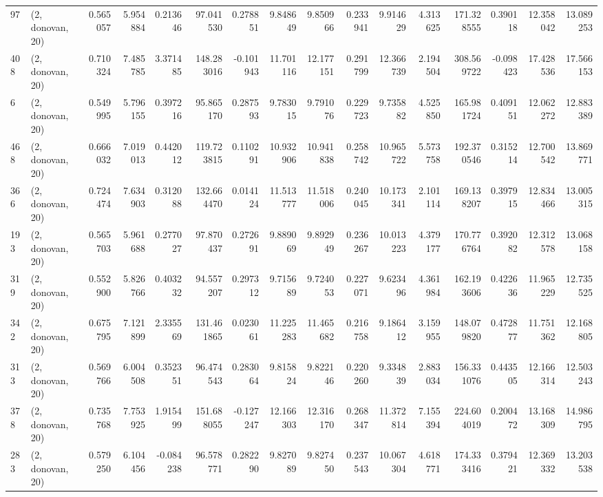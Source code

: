 \begin{tabular}{llrrrrrrrrrrrrrr}
97  &  (2, donovan, 20) &   0.565057 &   5.954884 &   0.213646 &    97.041530 &   0.278851 &   9.848649 &   9.850966 &  0.233941 &   9.914629 &   4.313625 &   171.328555 &  0.390118 &  12.358042 &  13.089253 \\
408 &  (2, donovan, 20) &   0.710324 &   7.485785 &   3.371485 &   148.283016 &  -0.101943 &  11.701116 &  12.177151 &  0.291799 &  12.366739 &   2.194504 &   308.569722 & -0.098423 &  17.428536 &  17.566153 \\
6   &  (2, donovan, 20) &   0.549995 &   5.796155 &   0.397216 &    95.865170 &   0.287593 &   9.783015 &   9.791076 &  0.229723 &   9.735882 &   4.525850 &   165.981724 &  0.409151 &  12.062272 &  12.883389 \\
468 &  (2, donovan, 20) &   0.666032 &   7.019013 &   0.442012 &   119.723815 &   0.110291 &  10.932906 &  10.941838 &  0.258742 &  10.965722 &   5.573758 &   192.370546 &  0.315214 &  12.700542 &  13.869771 \\
366 &  (2, donovan, 20) &   0.724474 &   7.634903 &   0.312088 &   132.664470 &   0.014124 &  11.513777 &  11.518006 &  0.240045 &  10.173341 &   2.101114 &   169.138207 &  0.397915 &  12.834466 &  13.005315 \\
193 &  (2, donovan, 20) &   0.565703 &   5.961688 &   0.277027 &    97.870437 &   0.272691 &   9.889069 &   9.892949 &  0.236267 &  10.013223 &   4.379177 &   170.776764 &  0.392082 &  12.312578 &  13.068158 \\
319 &  (2, donovan, 20) &   0.552900 &   5.826766 &   0.403232 &    94.557207 &   0.297312 &   9.715689 &   9.724053 &  0.227071 &   9.623496 &   4.361984 &   162.193606 &  0.422636 &  11.965229 &  12.735525 \\
342 &  (2, donovan, 20) &   0.675795 &   7.121899 &   2.335569 &   131.461865 &   0.023061 &  11.225283 &  11.465682 &  0.216758 &   9.186412 &   3.159955 &   148.079820 &  0.472877 &  11.751362 &  12.168805 \\
313 &  (2, donovan, 20) &   0.569766 &   6.004508 &   0.352351 &    96.474543 &   0.283064 &   9.815824 &   9.822146 &  0.220260 &   9.334839 &   2.883034 &   156.331076 &  0.443505 &  12.166314 &  12.503243 \\
378 &  (2, donovan, 20) &   0.735768 &   7.753925 &   1.915499 &   151.688055 &  -0.127247 &  12.166303 &  12.316170 &  0.268347 &  11.372814 &   7.155394 &   224.604019 &  0.200472 &  13.168309 &  14.986795 \\
283 &  (2, donovan, 20) &   0.579250 &   6.104456 &  -0.084238 &    96.578771 &   0.282290 &   9.827089 &   9.827450 &  0.237543 &  10.067304 &   4.618771 &   174.333416 &  0.379421 &  12.369332 &  13.203538 \\

\end{tabular}
